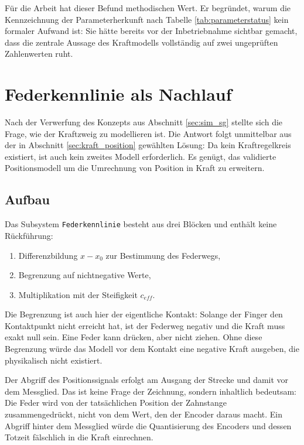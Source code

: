 Für die Arbeit hat dieser Befund methodischen Wert. Er begründet, warum die
Kennzeichnung der Parameterherkunft nach Tabelle \ref{tab:parameterstatus} kein
formaler Aufwand ist: Sie hätte bereits vor der Inbetriebnahme sichtbar gemacht, dass die
zentrale Aussage des Kraftmodells vollständig auf zwei ungeprüften Zahlenwerten ruht.

\section{Federkennlinie als Nachlauf}
\label{sec:sim_feder}

Nach der Verwerfung des Konzepts aus Abschnitt \ref{sec:sim_sg} stellte sich die Frage,
wie der Kraftzweig zu modellieren ist. Die Antwort folgt unmittelbar aus der in Abschnitt
\ref{sec:kraft_position} gewählten Lösung: Da kein Kraftregelkreis existiert, ist auch
kein zweites Modell erforderlich. Es genügt, das validierte Positionsmodell um die
Umrechnung von Position in Kraft zu erweitern.

\subsection*{Aufbau}

Das Subsystem \texttt{Federkennlinie} besteht aus drei Blöcken und enthält keine
Rückführung:

\begin{enumerate}
    \item Differenzbildung $x - x_0$ zur Bestimmung des Federwegs,
    \item Begrenzung auf nichtnegative Werte,
    \item Multiplikation mit der Steifigkeit $c_{eff}$.
\end{enumerate}

Die Begrenzung ist auch hier der eigentliche Kontakt: Solange der Finger den
Kontaktpunkt nicht erreicht hat, ist der Federweg negativ und die Kraft muss exakt null
sein. Eine Feder kann drücken, aber nicht ziehen. Ohne diese Begrenzung würde das Modell
vor dem Kontakt eine negative Kraft ausgeben, die physikalisch nicht existiert.

Der Abgriff des Positionssignals erfolgt am Ausgang der Strecke und damit vor dem
Messglied. Das ist keine Frage der Zeichnung, sondern inhaltlich bedeutsam: Die Feder wird
von der tatsächlichen Position der Zahnstange zusammengedrückt, nicht von dem Wert, den
der Encoder daraus macht. Ein Abgriff hinter dem Messglied würde die Quantisierung des
Encoders und dessen Totzeit fälschlich in die Kraft einrechnen.

